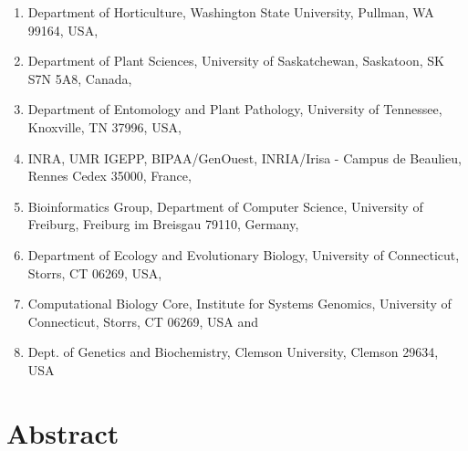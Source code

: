 \begin{enumerate}
\itemsep-0.5em
\item Department of Horticulture, Washington State University, Pullman, WA 99164, USA,\label{tripal-affil:1}
\item Department of Plant Sciences, University of Saskatchewan, Saskatoon, SK S7N 5A8, Canada,\label{tripal-affil:2}
\item Department of Entomology and Plant Pathology, University of Tennessee, Knoxville, TN 37996, USA,\label{tripal-affil:3}
\item INRA, UMR IGEPP, BIPAA/GenOuest, INRIA/Irisa - Campus de Beaulieu, Rennes Cedex 35000, France,\label{tripal-affil:4}
\item Bioinformatics Group, Department of Computer Science, University of Freiburg, Freiburg im Breisgau 79110, Germany,\label{tripal-affil:5}
\item Department of Ecology and Evolutionary Biology, University of Connecticut, Storrs, CT 06269, USA,\label{tripal-affil:6}
\item Computational Biology Core, Institute for Systems Genomics, University of Connecticut, Storrs, CT 06269, USA and\label{tripal-affil:7}
\item Dept. of Genetics and Biochemistry, Clemson University, Clemson 29634, USA\label{tripal-affil:8}
\end{enumerate}

\section*{Abstract}

